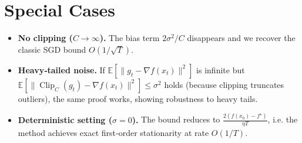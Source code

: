 \documentclass[11pt]{article}
\newcommand{\EE}{\mathbb{E}}
\begin{document}
\section*{Special Cases}
\begin{itemize}
\item \textbf{No clipping ($C\to\infty$).} The bias term $2\sigma^2/C$ disappears and we recover the classic SGD bound $O(1/\sqrt{T})$.
\item \textbf{Heavy‑tailed noise.} If $\EE[\|g_t-\nabla f(x_t)\|^2]$ is infinite but $\EE[\| \operatorname{Clip}_C(g_t)-\nabla f(x_t)\|^2]\le\sigma^2$ holds (because clipping truncates outliers), the same proof works, showing robustness to heavy tails.
\item \textbf{Deterministic setting ($\sigma=0$).} The bound reduces to $\frac{2(f(x_0)-f^\star)}{\eta T}$, i.e. the method achieves exact first‑order stationarity at rate $O(1/T)$.
\end{itemize}
\end{document}
